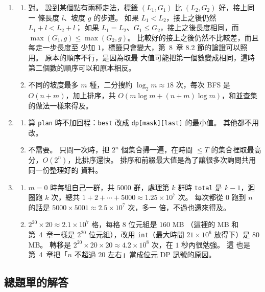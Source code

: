 \begin{enumerate}
\item
\begin{enumerate}
\item 對。 設到某個點有兩種走法，標籤 $(L_1, G_1)$ 比 $(L_2, G_2)$ 好，接上同一
條長度 $l$、坡度 $g$ 的步道。 如果 $L_1 < L_2$，接上之後仍然 $L_1 + l < L_2 + l$；
如果 $L_1 = L_2$、$G_1 \le G_2$，接上之後長度相同，而
$\max(G_1, g) \le \max(G_2, g)$。 比較好的接上之後仍然不比較差，而且每走一步長度至
少加 $1$，標籤只會變大，第~8~章 8.2 節的論證可以照用。 原本的順序不行，是因為取最
大值可能把第一個數變成相同，這時第二個數的順序可以和原本相反。
\item 不同的坡度最多 $m$ 種，二分搜約 $\log_2 m \approx 18$ 次，每次 BFS 是
$O(n + m)$，加上排序，共 $O(m \log m + (n + m) \log m)$，和並查集的做法一樣來得及。
\end{enumerate}

\item
\begin{enumerate}
\item 算 \texttt{plan} 時不加回程：\texttt{best} 改成
\texttt{dp[mask][last]} 的最小值。 其他都不用改。
\item 不需要。 只問一次時，把 $2^n$ 個集合掃一遍，在時間 $\le T$ 的集合裡取最高
分，$O(2^n)$，比排序還快。 排序和前綴最大值是為了讓很多次詢問共用同一份整理好的
資料。
\end{enumerate}

\item
\begin{enumerate}
\item $m = 0$ 時每組自己一群，共 $5000$ 群，處理第 $k$ 群時 \texttt{total} 是
$k - 1$，迴圈跑 $k$ 次，總共 $1 + 2 + \cdots + 5000 \approx 1.25 \times 10^7$ 次。
每次都從 $0$ 跑到 $n$ 的話是 $5000 \times 5001 \approx 2.5 \times 10^7$ 次，多一
倍，不過也還來得及。
\item $2^{20} \times 20 \approx 2.1 \times 10^7$ 格，每格 $8$ 位元組是 $160$ MB
（這裡的 MB 和第~4~章一樣是 $2^{20}$ 位元組），改用 \texttt{int}（最大時間
$21 \times 10^6$ 放得下）是 $80$ MB。 轉移是
$2^{20} \times 20 \times 20 \approx 4.2 \times 10^8$ 次，在 $1$ 秒內很勉強。 這
也是第~4~章把「$n$ 不超過 $20$ 左右」當成位元 DP 訊號的原因。
\end{enumerate}
\end{enumerate}

\subsection*{總題單的解答}

